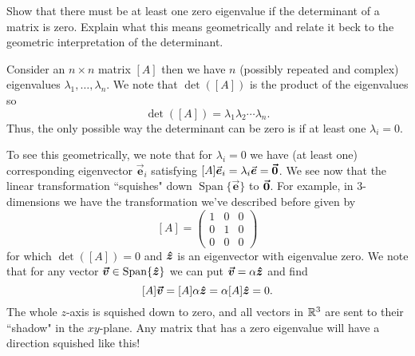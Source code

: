 \documentclass[12pt]{article} %
\newcommand{\evec}{\vec{\boldsymbol{e}}}
\begin{document}
\newpage
\begin{problem}
Show that there must be at least one zero eigenvalue if the determinant of a matrix is zero. Explain what this means geometrically and relate it beck to the geometric interpretation of the determinant.
\end{problem}
\begin{solution}
Consider an $n\times n$ matrix $[A]$ then we have $n$ (possibly repeated and complex) eigenvalues $\lambda_1,\dots,\lambda_n$. We note that $\det([A])$ is the product of the eigenvalues so
\[
\det([A])=\lambda_1 \lambda_2 \cdots \lambda_n.
\]
Thus, the only possible way the determinant can be zero is if at least one $\lambda_i=0$.

To see this geometrically, we note that for $\lambda_i=0$ we have (at least one) corresponding eigenvector $\evec_i$ satisfying $[A]\evec_i = \lambda_i \evec = \zerovec$.  We see now that the linear transformation ``squishes" down $\operatorname{Span}\{\evec\}$ to $\boldsymbol{\vec{0}}$. For example, in 3-dimensions we have the transformation we've described before given by
\[
[A] = \begin{pmatrix} 1 & 0 & 0 \\ 0 & 1 & 0 \\ 0 & 0 & 0 \end{pmatrix}
\]
for which $\det([A])=0$ and $\boldsymbol{\hat{z}}$ is an eigenvector with eigenvalue zero.  We note that for any vector $\boldsymbol{\boldsymbol{\vec{v}}}\in \operatorname{Span}\{\boldsymbol{\hat{z}}\}$ we can put $\boldsymbol{\boldsymbol{\vec{v}}} = \alpha \boldsymbol{\hat{z}}$ and find 
\[
[A]\boldsymbol{\boldsymbol{\vec{v}}} = [A]\alpha \boldsymbol{\hat{z}} = \alpha [A]\boldsymbol{\hat{z}} = 0.
\]
The whole $z$-axis is squished down to zero, and all vectors in $\mathbb{R}^3$ are sent to their ``shadow" in the $xy$-plane.  Any matrix that has a zero eigenvalue will have a direction squished like this!
\end{solution}
\end{document}
